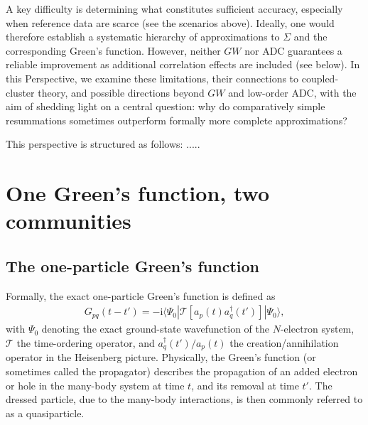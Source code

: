 \documentclass[aip,jcp,reprint,noshowkeys,superscriptaddress]{revtex4-2}
\begin{document}
A key difficulty is determining what constitutes sufficient accuracy, especially when reference data are scarce (see the scenarios above).
Ideally, one would therefore establish a systematic hierarchy of approximations to $\Sigma$ and the corresponding Green's function.
However, neither $GW$ nor ADC guarantees a reliable improvement as additional correlation effects are included (see below).
In this Perspective, we examine these limitations, their connections to coupled-cluster theory, and possible directions beyond $GW$ and low-order ADC, with the aim of shedding light on a central question:
why do comparatively simple resummations sometimes outperform formally more complete approximations?

This perspective is structured as follows: 
.....

\section{One Green's function, two communities}
\subsection{The one-particle Green's function}
Formally, the exact one-particle Green's function is defined as 
\begin{align}
    G_{pq}(t-t') = -\mathrm{i} \langle \Psi_0 | \mathcal{T} \left[ a_p(t) a_q^\dagger(t') \right] | \Psi_0 \rangle,
\end{align}
with $\Psi_0$ denoting the exact ground-state wavefunction of the $N$-electron system, $\mathcal{T}$ the time-ordering operator, and $a_q^\dagger(t')/a_p(t)$ the creation/annihilation operator in the Heisenberg picture.
Physically, the Green's function (or sometimes called the propagator) describes the propagation of an added electron or hole in the many-body system at time $t$, and its removal at time $t'$.
The dressed particle, due to the many-body interactions, is then commonly referred to as a quasiparticle.
\end{document}
